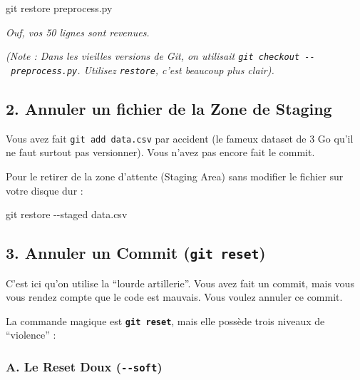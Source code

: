 \documentclass[
  letterpaper,
  DIV=11,
  numbers=noendperiod]{scrreprt}
\newenvironment{Shaded}{\begin{snugshade}}{\end{snugshade}}
\newcommand{\AttributeTok}[1]{\textcolor[rgb]{0.40,0.45,0.13}{#1}}
\newcommand{\FunctionTok}[1]{\textcolor[rgb]{0.28,0.35,0.67}{#1}}
\newcommand{\NormalTok}[1]{\textcolor[rgb]{0.00,0.23,0.31}{#1}}
\begin{document}
\begin{Shaded}
\begin{Highlighting}[]
\FunctionTok{git}\NormalTok{ restore preprocess.py}
\end{Highlighting}
\end{Shaded}

\emph{Ouf, vos 50 lignes sont revenues.}

\emph{(Note : Dans les vieilles versions de Git, on utilisait
\texttt{git\ checkout\ -\/-\ preprocess.py}. Utilisez \texttt{restore},
c'est beaucoup plus clair).}

\subsection{2. Annuler un fichier de la Zone de
Staging}\label{annuler-un-fichier-de-la-zone-de-staging}

Vous avez fait \texttt{git\ add\ data.csv} par accident (le fameux
dataset de 3 Go qu'il ne faut surtout pas versionner). Vous n'avez pas
encore fait le commit.

Pour le retirer de la zone d'attente (Staging Area) sans modifier le
fichier sur votre disque dur :

\begin{Shaded}
\begin{Highlighting}[]
\FunctionTok{git}\NormalTok{ restore }\AttributeTok{{-}{-}staged}\NormalTok{ data.csv}
\end{Highlighting}
\end{Shaded}

\subsection{\texorpdfstring{3. Annuler un Commit
(\texttt{git\ reset})}{3. Annuler un Commit (git reset)}}\label{annuler-un-commit-git-reset}

C'est ici qu'on utilise la ``lourde artillerie''. Vous avez fait un
commit, mais vous vous rendez compte que le code est mauvais. Vous
voulez annuler ce commit.

La commande magique est \textbf{\texttt{git\ reset}}, mais elle possède
trois niveaux de ``violence'' :

\subsubsection{\texorpdfstring{A. Le Reset Doux
(\texttt{-\/-soft})}{A. Le Reset Doux (-\/-soft)}}\label{a.-le-reset-doux---soft}
\end{document}
